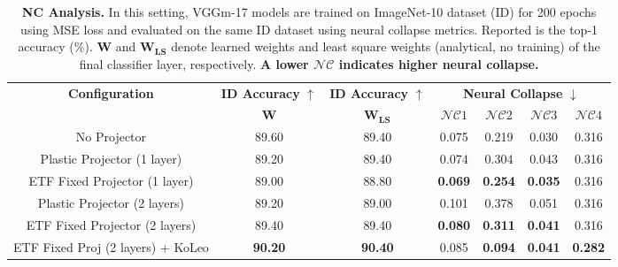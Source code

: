 \begin{table*}[t]
\centering
  \caption{\textbf{NC Analysis.} In this setting, VGGm-17 models are trained on ImageNet-10 dataset (ID) for 200 epochs using MSE loss and evaluated on the same ID dataset using neural collapse metrics. Reported is the top-1 accuracy (\%). $\mathbf{W}$ and $\mathbf{W_{LS}}$ denote learned weights and least square weights (analytical, no training) of the final classifier layer, respectively. \textbf{A lower $\mathcal{NC}$ indicates higher  neural collapse.}}
  \label{tab:nc_results}
  \centering
     \begin{tabular}{ccc|cccc}
     \hline %
     \multicolumn{1}{c}{\textbf{Configuration}} &
     \multicolumn{1}{c}{\textbf{ID Accuracy} $\uparrow$} &
     \multicolumn{1}{c|}{\textbf{ID Accuracy} $\uparrow$} &
     \multicolumn{4}{c}{\textbf{Neural Collapse} $\downarrow$} \\
    & $\mathbf{W}$ & $\mathbf{W_{LS}}$ & $\mathcal{NC}1$ &  $\mathcal{NC}2$ &  $\mathcal{NC}3$ &  $\mathcal{NC}4$ \\
    \hline
    No Projector & 89.60 & 89.40 & 0.075 & 0.219 & 0.030 & 0.316 \\
    \hline
    Plastic Projector (1 layer) & 89.20 & 89.40 & 0.074 & 0.304 & 0.043 & 0.316 \\
    ETF Fixed Projector (1 layer) & 89.00 & 88.80 & \textbf{0.069} & \textbf{0.254} & \textbf{0.035} & 0.316 \\
    \hline
    Plastic Projector (2 layers) & 89.20 & 89.00 & 0.101 & 0.378 & 0.051 & 0.316 \\
    ETF Fixed Projector (2 layers) & 89.40 & 89.40 & \textbf{0.080} & \textbf{0.311} & \textbf{0.041} & 0.316 \\
    ETF Fixed Proj (2 layers) + KoLeo & \textbf{90.20} & \textbf{90.40} & 0.085 & \textbf{0.094} & \textbf{0.041} & \textbf{0.282} \\
    \hline %
    \end{tabular} %
\end{table*}